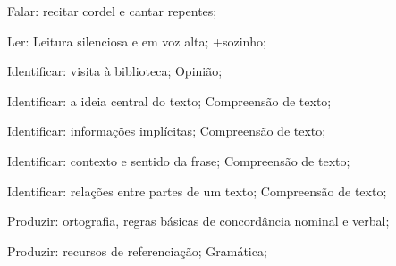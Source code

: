  Falar: recitar cordel e cantar repentes;  

 Ler: Leitura silenciosa e em voz alta; +sozinho; 

 Identificar: visita à biblioteca; Opinião;

 Identificar: a ideia central do texto; Compreensão de texto;

 Identificar: informações implícitas; Compreensão de texto;

 Identificar: contexto e sentido da frase; Compreensão de texto;

 Identificar: relações entre partes de um texto; Compreensão de texto;

 Produzir: ortografia, regras básicas de concordância nominal e verbal;

 Produzir: recursos de referenciação; Gramática;

